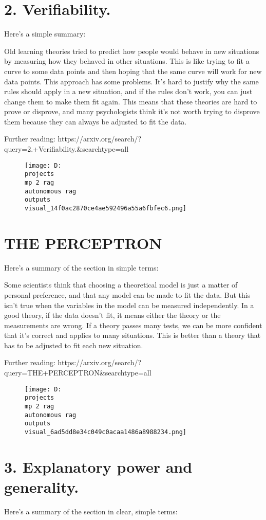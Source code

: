 \documentclass[12pt,a4paper]{article}
\begin{document}
\section{2. Verifiability.}
Here's a simple summary:

Old learning theories tried to predict how people would behave in new situations by measuring how they behaved in other situations. This is like trying to fit a curve to some data points and then hoping that the same curve will work for new data points. This approach has some problems. It's hard to justify why the same rules should apply in a new situation, and if the rules don't work, you can just change them to make them fit again. This means that these theories are hard to prove or disprove, and many psychologists think it's not worth trying to disprove them because they can always be adjusted to fit the data.

Further reading: https://arxiv.org/search/?query=2.+Verifiability.&searchtype=all
\begin{figure}[h]
\centering
\texttt{[image: D:\\projects\\mp 2 rag\\autonomous rag\\outputs\\visual\_14f0ac2870ce4ae592496a55a6fbfec6.png]}
\end{figure}
\section{THE PERCEPTRON}
Here's a summary of the section in simple terms:

Some scientists think that choosing a theoretical model is just a matter of personal preference, and that any model can be made to fit the data. But this isn't true when the variables in the model can be measured independently. In a good theory, if the data doesn't fit, it means either the theory or the measurements are wrong. If a theory passes many tests, we can be more confident that it's correct and applies to many situations. This is better than a theory that has to be adjusted to fit each new situation.

Further reading: https://arxiv.org/search/?query=THE+PERCEPTRON&searchtype=all
\begin{figure}[h]
\centering
\texttt{[image: D:\\projects\\mp 2 rag\\autonomous rag\\outputs\\visual\_6ad5dd8e34c049c0acaa1486a8988234.png]}
\end{figure}
\section{3. Explanatory power and generality.}
Here's a summary of the section in clear, simple terms:
\end{document}
